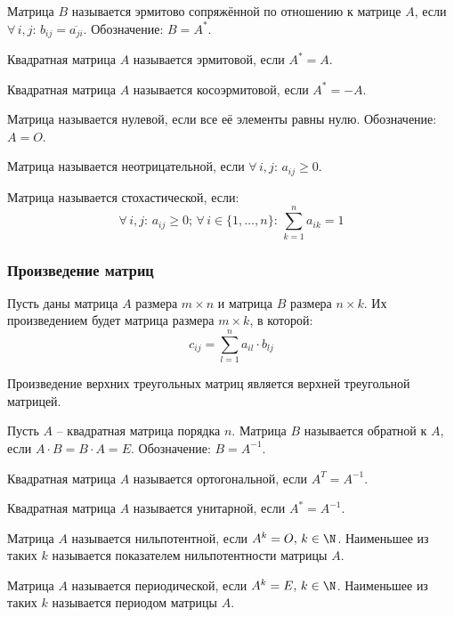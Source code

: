 \documentclass[12pt]{article}
\begin{document}
\begin{definition}
    Матрица $B$ называется эрмитово сопряжённой по отношению к матрице $A$, если $\forall\,i,j:\,b_{ij}=\overline{a_{ji}}$. Обозначение: $B=A^*$.
\end{definition}
\begin{definition}
    Квадратная матрица $A$ называется эрмитовой, если $A^*=A$.
\end{definition}
\begin{definition}
    Квадратная матрица $A$ называется косоэрмитовой, если $A^*=-A$.
\end{definition}
\begin{definition}
    Матрица называется нулевой, если все её элементы равны нулю. Обозначение: $A=O$.
\end{definition}
\begin{definition}
    Матрица называется неотрицательной, если $\forall\,i,j:\,a_{ij}\geq0$.
\end{definition}
\begin{definition}
    Матрица называется стохастической, если:
    $$\forall\,i,j:\,a_{ij}\geq0;\,\forall\,i\in\{1,\ldots,n\}:\,\sum_{k=1}^{n}a_{ik}=1$$
\end{definition}

\subsubsection{Произведение матриц}

\begin{definition}
    Пусть даны матрица $A$ размера $m\times n$ и матрица $B$ размера $n\times k$. Их произведением будет матрица размера $m\times k$, в которой:
    $$c_{ij}=\sum_{l=1}^{n}a_{il}\cdot b_{lj}$$
\end{definition}
\begin{statement}
    Произведение верхних треугольных матриц является верхней треугольной матрицей.
\end{statement}
\begin{definition}
    Пусть $A$ – квадратная матрица порядка $n$. Матрица $B$ называется обратной к $A$, если $A\cdot B=B\cdot A=E$. Обозначение: $B=A^{-1}$.
\end{definition}
\begin{definition}
    Квадратная матрица $A$ называется ортогональной, если $A^T=A^{-1}$.
\end{definition}
\begin{definition}
    Квадратная матрица $A$ называется унитарной, если $A^*=A^{-1}$.
\end{definition}
\begin{definition}
    Матрица $A$ называется нильпотентной, если $A^k=O,\,k\in \N$. Наименьшее из таких $k$ называется показателем нильпотентности матрицы $A$.
\end{definition}
\begin{definition}
    Матрица $A$ называется периодической, если $A^k=E,\,k\in \N$. Наименьшее из таких $k$ называется периодом матрицы $A$.
\end{definition}
\end{document}
